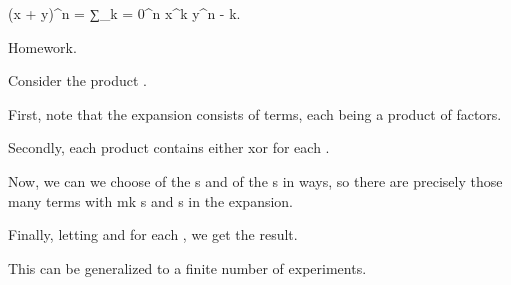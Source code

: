 \startchapter [title={Binomial Theorem}]

	\starttheorem [title={Binomial theorem}]
		\startformula
			(x + y)^n = ∑_{k = 0}^n  x^k y^{n - k}.
		\stopformula
	\stoptheorem
	
	\startproof [title={Inductive}]
		Homework.
	\stopproof

	\startproof [title={Combinatorial}]
		Consider the product .

		First, note that the expansion consists of  terms, each being a product of  factors.

		Secondly, each product contains either  xor  for each .


		Now, we can we choose  of the s and  of the s in  ways, so there are precisely those many terms with m{k} s and  s in the expansion.

		Finally, letting  and  for each , we get the result.
	\stopproof

	\startremark
		This can be generalized to a finite number of experiments.
	\stopremark


\stopchapter
